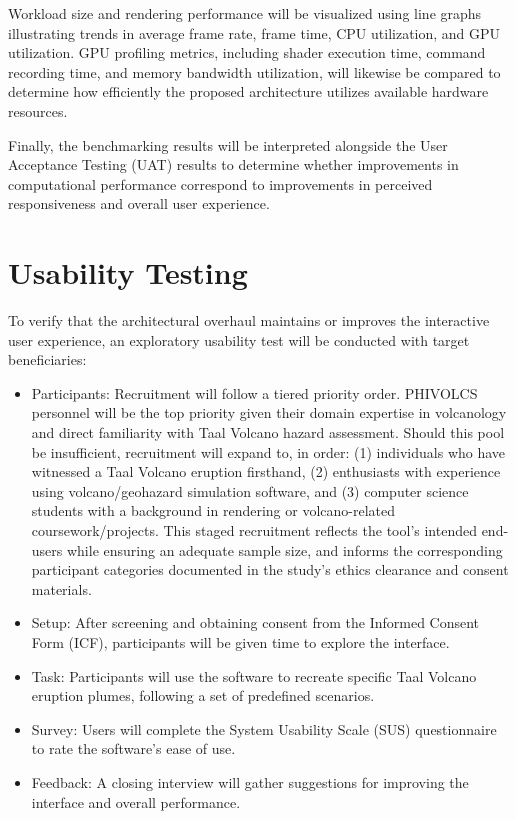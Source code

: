 Workload size and rendering performance will be visualized using line graphs illustrating trends in average frame rate, frame time, CPU utilization, and GPU utilization. GPU profiling metrics, including shader execution time, command recording time, and memory bandwidth utilization, will likewise be compared to determine how efficiently the proposed architecture utilizes available hardware resources. 

Finally, the benchmarking results will be interpreted alongside the User Acceptance Testing (UAT) results to determine whether improvements in computational performance correspond to improvements in perceived responsiveness and overall user experience.


\section{Usability Testing}

To verify that the architectural overhaul maintains or improves the interactive user experience, an exploratory usability test will be conducted with target beneficiaries:
\begin{itemize}
    \item Participants: Recruitment will follow a tiered priority order. PHIVOLCS personnel will be the top priority given their domain expertise in volcanology and direct familiarity with Taal Volcano hazard assessment. Should this pool be insufficient, recruitment will expand to, in order: (1) individuals who have witnessed a Taal Volcano eruption firsthand, (2) enthusiasts with experience using volcano/geohazard simulation software, and (3) computer science students with a background in rendering or volcano-related coursework/projects. This staged recruitment reflects the tool's intended end-users while ensuring an adequate sample size, and informs the corresponding participant categories documented in the study's ethics clearance and consent materials.
    \item Setup:  After screening and obtaining consent from the Informed Consent Form (ICF), participants will be given time to explore the interface.
    \item Task:  Participants will use the software to recreate specific Taal Volcano eruption plumes, following a set of predefined scenarios.
    \item Survey: Users will complete the System Usability Scale (SUS) questionnaire to rate the software's ease of use.
    \item Feedback: A closing interview will gather suggestions for improving the interface and overall performance.
\end{itemize}


